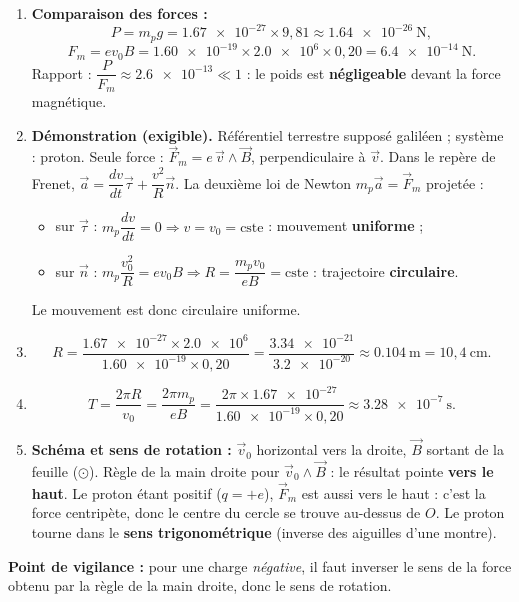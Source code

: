 \documentclass[11pt]{article}
\begin{document}
\begin{corrige}
\begin{enumerate}
\item \textbf{Comparaison des forces :}
\[
P = m_p g = \num{1,67e-27}\times 9,81 \approx \num{1,64e-26}~\mathrm{N},
\]
\[
F_m = ev_0B = \num{1,60e-19}\times\num{2,0e6}\times 0,20 = \num{6,4e-14}~\mathrm{N}.
\]
Rapport : $\dfrac{P}{F_m} \approx \num{2,6e-13} \ll 1$ : le poids est \textbf{négligeable} devant la force magnétique.
\item \textbf{Démonstration (exigible).} Référentiel terrestre supposé galiléen ; système : proton. Seule force : $\vec{F}_m = e\,\vec{v}\wedge\vec{B}$, perpendiculaire à $\vec{v}$. Dans le repère de Frenet, $\vec{a} = \dfrac{dv}{dt}\vec{\tau} + \dfrac{v^2}{R}\vec{n}$. La deuxième loi de Newton $m_p\vec{a} = \vec{F}_m$ projetée :
\begin{itemize}
\item sur $\vec{\tau}$ : $m_p\dfrac{dv}{dt} = 0 \Rightarrow v = v_0 = \text{cste}$ : mouvement \textbf{uniforme} ;
\item sur $\vec{n}$ : $m_p\dfrac{v_0^2}{R} = ev_0B \Rightarrow R = \dfrac{m_p v_0}{eB} = \text{cste}$ : trajectoire \textbf{circulaire}.
\end{itemize}
Le mouvement est donc circulaire uniforme.
\item \[
R = \frac{\num{1,67e-27}\times\num{2,0e6}}{\num{1,60e-19}\times 0,20} = \frac{\num{3,34e-21}}{\num{3,2e-20}} \approx \num{0,104}~\mathrm{m} = 10,4~\mathrm{cm}.
\]
\item \[
T = \frac{2\pi R}{v_0} = \frac{2\pi m_p}{eB} = \frac{2\pi\times\num{1,67e-27}}{\num{1,60e-19}\times 0,20} \approx \num{3,28e-7}~\mathrm{s}.
\]
\item \textbf{Schéma et sens de rotation :} $\vec{v}_0$ horizontal vers la droite, $\vec{B}$ sortant de la feuille ($\odot$). Règle de la main droite pour $\vec{v}_0\wedge\vec{B}$ : le résultat pointe \textbf{vers le haut}. Le proton étant positif ($q = +e$), $\vec{F}_m$ est aussi vers le haut : c'est la force centripète, donc le centre du cercle se trouve au-dessus de $O$. Le proton tourne dans le \textbf{sens trigonométrique} (inverse des aiguilles d'une montre).
\end{enumerate}
\textbf{Point de vigilance :} pour une charge \emph{négative}, il faut inverser le sens de la force obtenu par la règle de la main droite, donc le sens de rotation.
\end{corrige}
\end{document}
